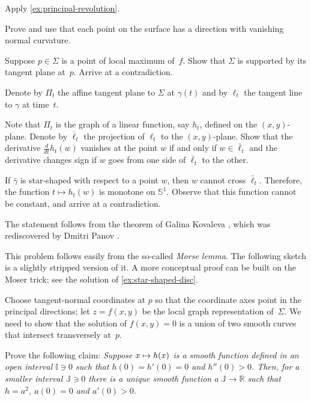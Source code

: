 Apply \ref{ex:principal-revolution}.

Prove and use that each point on the surface has a direction with vanishing normal curvature.

 Suppose $p\in \Sigma$ is a point of local maximum of~$f$.
Show that $\Sigma$ is supported by its tangent plane at~$p$.
Arrive at a contradiction.


Denote by $\Pi_t$ the affine tangent plane to $\Sigma$ at $\gamma(t)$ and by $\ell_t$ the tangent line to $\gamma$ at time~$t$.

Note that $\Pi_t$ is the graph of a linear function, say $h_t$, defined on the $(x, y)$-plane.
Denote by $\bar\ell_t$ the projection of $\ell_t$ to the $(x, y)$-plane.
Show that the derivative $\tfrac{d}{dt}h_t(w)$ vanishes at the point $w$ if and only if $w\in \bar\ell_t$ 
and the derivative changes sign if $w$ goes from one side of $\bar\ell_t$ to the other.

If $\bar\gamma$ is star-shaped with respect to a point $w$, then $w$ cannot cross $\bar\ell_t$.
Therefore, the function $t\mapsto h_t(w)$ is monotone on $\mathbb{S}^1$.
Observe that this function cannot be constant, and arrive at a contradiction.

The statement follows from the theorem of Galina Kovaleva \cite{kovaleva}, which was rediscovered by Dmitri Panov \cite{panov-curves}.

This problem follows easily from the so-called \emph{Morse lemma}.
The following sketch is a slightly stripped version of it.
A more conceptual proof \cite{abraham-marsden-ratiu}
can be built on the Moser trick; see the solution of \ref{ex:star-shaped-disc}.

\medskip

Choose tangent-normal coordinates at $p$ so that the coordinate axes point in the principal directions;
let $z=f(x,y)$ be the local graph representation of~$\Sigma$.
We need to show that the solution of $f(x,y)=0$ is a union of two smooth curves that intersect transversely at~$p$.

Prove the following claim:
\textit{Suppose $x\z\mapsto h(x)$ is a smooth function defined in an open interval $\mathbb{I}\ni0$ such that $h(0)=h'(0)=0$ and $h''(0)>0$.
Then, for a smaller interval $\mathbb{J}\ni0$ there is a unique smooth function $a\:\mathbb{J}\to\mathbb{R}$ such that $h=a^2$, $a(0)=0$ and $a'(0)> 0$.}


